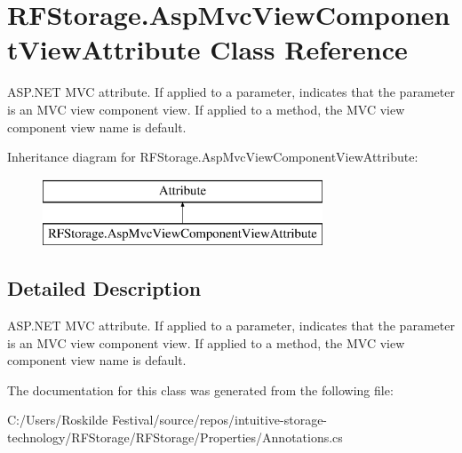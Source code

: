 \hypertarget{class_r_f_storage_1_1_asp_mvc_view_component_view_attribute}{}\section{R\+F\+Storage.\+Asp\+Mvc\+View\+Component\+View\+Attribute Class Reference}
\label{class_r_f_storage_1_1_asp_mvc_view_component_view_attribute}


A\+S\+P.\+N\+ET M\+VC attribute. If applied to a parameter, indicates that the parameter is an M\+VC view component view. If applied to a method, the M\+VC view component view name is default.  


Inheritance diagram for R\+F\+Storage.\+Asp\+Mvc\+View\+Component\+View\+Attribute\+:\begin{figure}[H]
\begin{center}
\leavevmode
\includegraphics[height=2.000000cm]{class_r_f_storage_1_1_asp_mvc_view_component_view_attribute}
\end{center}
\end{figure}


\subsection{Detailed Description}
A\+S\+P.\+N\+ET M\+VC attribute. If applied to a parameter, indicates that the parameter is an M\+VC view component view. If applied to a method, the M\+VC view component view name is default. 



The documentation for this class was generated from the following file\+:\begin{DoxyCompactItemize}
\item 
C\+:/\+Users/\+Roskilde Festival/source/repos/intuitive-\/storage-\/technology/\+R\+F\+Storage/\+R\+F\+Storage/\+Properties/Annotations.\+cs\end{DoxyCompactItemize}
